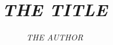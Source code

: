 \documentclass[
draft,
online,
]{uhull_dcs_thesis}
\title{{\em THE TITLE}}
\author{{\em THE AUTHOR}}
\begin{document}
\frontmatter

\begin{spacing}{1}
  \maketitle
  
  \tableofcontents
\end{spacing}

\mainmatter







\appendix




\backmatter

\begin{spacing}{1}
  
\end{spacing}
\end{document}
